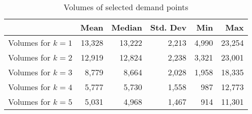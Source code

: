 \begin{table}[H]
\centering
\begin{tabular}{lrrrrr}
 & Mean  & Median  & Std. Dev  & Min  & Max  \\  \midrule 
Volumes for $k=1$ &    13,328 &    13,222 &     2,213 &     4,990 &    23,254 \\  
Volumes for $k=2$  &    12,919 &    12,824 &     2,238 &     3,321 &    23,001 \\  
Volumes for $k=3$ &     8,779 &     8,664 &     2,028 &     1,958 &    18,335 \\  
Volumes for $k=4$  &     5,777 &     5,730 &     1,558 &       987 &    12,773 \\  
Volumes for $k=5$ &     5,031 &     4,968 &     1,467 &       914 &    11,301 \\  
\bottomrule
\end{tabular}
\caption{\label{selectedVolumesPurchase} Volumes of selected demand points}
\end{table}
